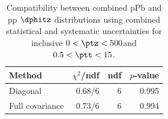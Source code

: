 \begin{table}[htp!]
\centering
\begin{tabular}{|l|r|r|r|}
\hline
Method & $\chi^2$/ndf & ndf & $p$-value \\
\hline
Diagonal & 0.68/6 & 6 & 0.995 \\
Full covariance & 0.73/6 & 6 & 0.994 \\
\hline
\end{tabular}
\caption{Compatibility between combined pPb and pp $\dphitz$ distributions using combined statistical and systematic uncertainties for inclusive $0 < \ptz < 500$\GeV and $0.5 < \ptt < 15$\GeV.}
\label{table:chisq_dphi}
\end{table}

